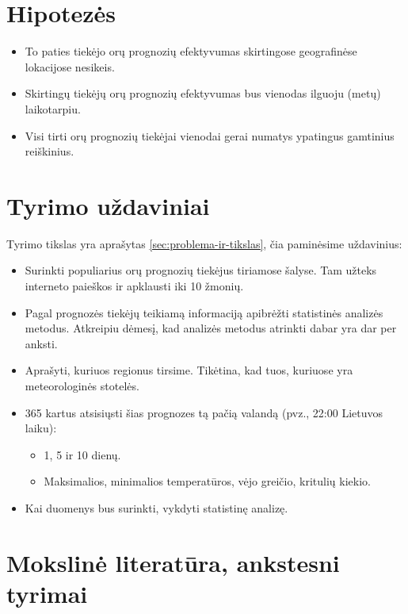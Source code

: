 \documentclass{article}
\begin{document}
\section{Hipotezės}

\begin{itemize}
    \item To paties tiekėjo orų prognozių efektyvumas skirtingose geografinėse
        lokacijose nesikeis.
    \item Skirtingų tiekėjų orų prognozių efektyvumas bus vienodas ilguoju
        (metų) laikotarpiu.
    \item Visi tirti orų prognozių tiekėjai vienodai gerai numatys ypatingus
        gamtinius reiškinius.
\end{itemize}

\section{Tyrimo uždaviniai}

Tyrimo tikslas yra aprašytas \autoref{sec:problema-ir-tikslas}, čia paminėsime
uždavinius:

\begin{itemize}
    \item Surinkti populiarius orų prognozių tiekėjus tiriamose šalyse. Tam užteks
        interneto paieškos ir apklausti iki 10 žmonių.
    \item Pagal prognozės tiekėjų teikiamą informaciją apibrėžti statistinės
        analizės metodus. Atkreipiu dėmesį, kad analizės metodus atrinkti dabar
        yra dar per anksti.
    \item Aprašyti, kuriuos regionus tirsime. Tikėtina, kad tuos, kuriuose yra
        meteorologinės stotelės.
    \item 365 kartus atsisiųsti šias prognozes tą pačią valandą (pvz., 22:00
        Lietuvos laiku):
        \begin{itemize}
            \item 1, 5 ir 10 dienų.
            \item Maksimalios, minimalios temperatūros, vėjo greičio, kritulių kiekio.
        \end{itemize}
    \item Kai duomenys bus surinkti, vykdyti statistinę analizę.
\end{itemize}

\section{Mokslinė literatūra, ankstesni tyrimai}
\end{document}
